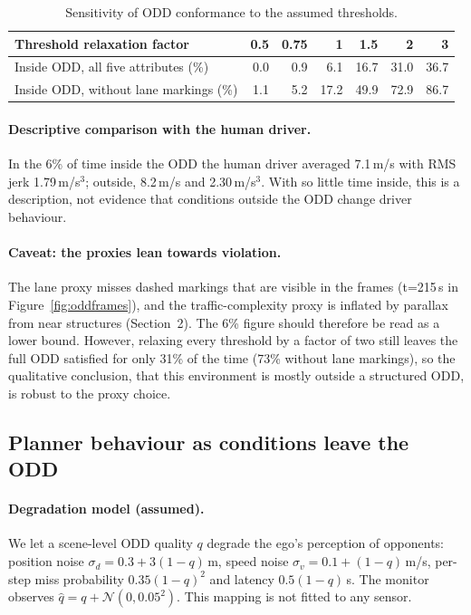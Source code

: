 \begin{table}[H]\centering\small
\begin{tabular}{lrrrrrr}\toprule
Threshold relaxation factor & 0.5 & 0.75 & 1 & 1.5 & 2 & 3\\\midrule
Inside ODD, all five attributes (\%) & 0.0 & 0.9 & 6.1 & 16.7 & 31.0 & 36.7\\
Inside ODD, without lane markings (\%) & 1.1 & 5.2 & 17.2 & 49.9 & 72.9 & 86.7\\\bottomrule
\end{tabular}\caption{Sensitivity of ODD conformance to the assumed thresholds.}\end{table}

\paragraph{Descriptive comparison with the human driver.} In the 6\% of time inside the ODD the human driver averaged 7.1\,m/s with RMS jerk 1.79\,m/s$^3$; outside, 8.2\,m/s and 2.30\,m/s$^3$. With so little time inside, this is a description, not evidence that conditions outside the ODD change driver behaviour.

\paragraph{Caveat: the proxies lean towards violation.} The lane proxy misses dashed markings that are visible in the frames (t=215\,s in Figure~\ref{fig:oddframes}), and the traffic-complexity proxy is inflated by parallax from near structures (Section~2). The 6\% figure should therefore be read as a lower bound. However, relaxing every threshold by a factor of two still leaves the full ODD satisfied for only 31\% of the time (73\% without lane markings), so the qualitative conclusion, that this environment is mostly outside a structured ODD, is robust to the proxy choice.

\subsection{Planner behaviour as conditions leave the ODD}
\paragraph{Degradation model (assumed).} We let a scene-level ODD quality $q$ degrade the ego's perception of opponents: position noise $\sigma_d=0.3+3(1-q)$\,m, speed noise $\sigma_v=0.1+(1-q)$\,m/s, per-step miss probability $0.35(1-q)^2$ and latency $0.5(1-q)$\,s. The monitor observes $\hat q=q+\mathcal N(0,0.05^2)$. This mapping is not fitted to any sensor.


